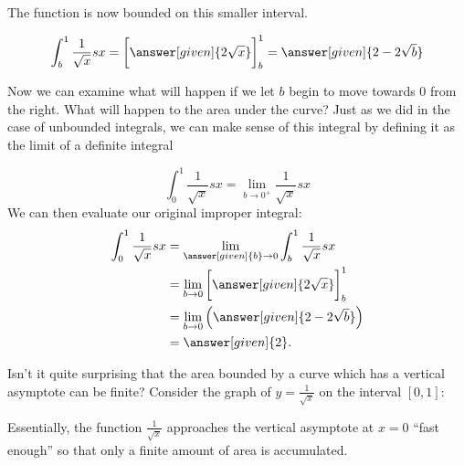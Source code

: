\documentclass{ximera}
\begin{document}
\begin{example}
\begin{explanation}
The function is now bounded on this smaller interval. 

\[
\int_{b}^1 \frac{1}{\sqrt{x}} sx=  \bigg[\answer[given]{2\sqrt{x}}\bigg]_b^1=\answer[given]{2-2\sqrt{b}}
\]

Now we can examine what will happen if we let $b$ begin to move towards $0$ from the right. What will happen to the area under the curve? 
Just as we did in the case of unbounded integrals, we can make sense of this integral by defining it as the limit of a definite integral 

\[
\int_{0}^{1} \frac{1}{\sqrt{x}} sx=\lim_{b \to 0^{+}} \frac{1}{\sqrt{x}} sx
\]
We can then evaluate our original improper integral: 
    \begin{align*}
      \int_{0}^1 \frac{1}{\sqrt{x}} sx &= \lim_{\answer[given]{b} \to 0} \int_{b}^1 \frac{1}{\sqrt{x}} sx \\
      &=  \lim_{b \to 0}  \bigg[\answer[given]{2\sqrt{x}}\bigg]_b^1 \\
      &=  \lim_{b \to 0} \left(\answer[given]{2-2\sqrt{b}}\right)\\
      &= \answer[given]{2}.
    \end{align*}

Isn't it quite surprising that the area bounded by a curve which has a
vertical asymptote can be finite? Consider the graph of $y=
\frac{1}{\sqrt{x}}$ on the interval $[0,1]$:

\begin{image}
\end{image}

Essentially, the function $\frac{1}{\sqrt{x}}$ approaches the vertical asymptote at $x=0$ ``fast enough'' so that only a finite amount of area is accumulated. 

  \end{explanation}
\end{example}
\end{document}
